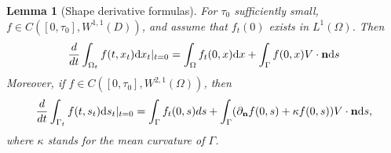\documentclass[oneside,11pt]{book}
\numberwithin{equation}{section}
\newtheorem{lemma}{Lemma}[section]
\begin{document}
\begin{lemma}[Shape derivative formulas]
    For $\tau_0$ sufficiently small, $f\in C([0,\tau_0],W^{1,1}(D))$, and assume that $f_t(0)$ exists in $L^1(\Omega)$. Then
    \begin{align}
        \label{shape derivative volume integral}
        \frac{d}{dt}\int_{\Omega_t} f(t,x_t){\rm d}x_t|_{t=0} = \int_\Omega f_t(0,x){\rm d}x + \int_\Gamma f(0,x)V\cdot{\bf n}{\rm d}s
    \end{align}
    Moreover, if $f\in C([0,\tau_0],W^{2,1}(\Omega))$, then
    \begin{align}
        \label{shape derivative boundary integral}
        \frac{d}{dt}\int_{\Gamma_t} f(t,s_t){\rm d}s_t|_{t=0} = \int_\Gamma f_t(0,s)ds + \int_\Gamma (\partial_{\bf n}f(0,s) + \kappa f(0,s))V\cdot{\bf n}{\rm d}s,
    \end{align}
    where $\kappa$ stands for the mean curvature of $\Gamma$.
\end{lemma}
\end{document}
